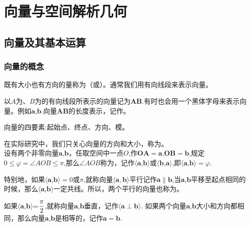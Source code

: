 \chapter{向量与空间解析几何}
\section{向量及其基本运算}
\subsection{向量的概念}
既有大小也有方向的量称为（或）。通常我们用有向线段来表示向量。
\par 以$A$为、$B$为的有向线段所表示的向量记为$\boldsymbol{AB}$.有时也会用一个黑体字母来表示向量。例如$\boldsymbol{a}$,$\boldsymbol{b}$.向量$\boldsymbol{AB}$的长度表示，记作。
\par 向量的四要素:起始点、终点、方向、模。

在实际研究中，我们只关心向量的方向和大小，称为。\\

\vspace*{-1em}
设有两个非零向量$\boldsymbol{a}$,$\boldsymbol{b}$，任取空间中一点$O$,作$\boldsymbol{OA}=\boldsymbol{a}$,$\boldsymbol{OB}=\boldsymbol{b}$,规定$0\leq \varphi=\angle AOB\leq \pi$,那么$\angle AOB$称为，记作$\langle\boldsymbol{a}$,$\boldsymbol{b}\rangle$或$\langle\boldsymbol{b}$,$\boldsymbol{a}\rangle$,即$\langle\boldsymbol{a}$,$\boldsymbol{b}\rangle=\varphi$.
\par 特别地，如果$\langle\boldsymbol{a}$,$\boldsymbol{b}\rangle=0$或$\pi$,就称向量$\langle\boldsymbol{a},\boldsymbol{b}
\rangle$平行记作$\boldsymbol{a}\parallel\boldsymbol{b}$,当$\boldsymbol{a}$,$\boldsymbol{b}$平移至起点相同的时候，那么$\langle\boldsymbol{a}$,$\boldsymbol{b}\rangle$一定共线。所以，两个平行的向量也称为。
\par 如果$\langle\boldsymbol{a}$,$\boldsymbol{b}\rangle$=$\displaystyle\frac{\pi}{2}$,就称向量$\boldsymbol{a}$,$\boldsymbol{b}$垂直，记作$\langle\boldsymbol{a}\perp\boldsymbol{b}\rangle$.
如果两个向量$\boldsymbol{a}$,$\boldsymbol{b}$大小和方向都相同，那么向量$\boldsymbol{a}$,$\boldsymbol{b}$是相等的，记作$\boldsymbol{a}=\boldsymbol{b}$.\\

